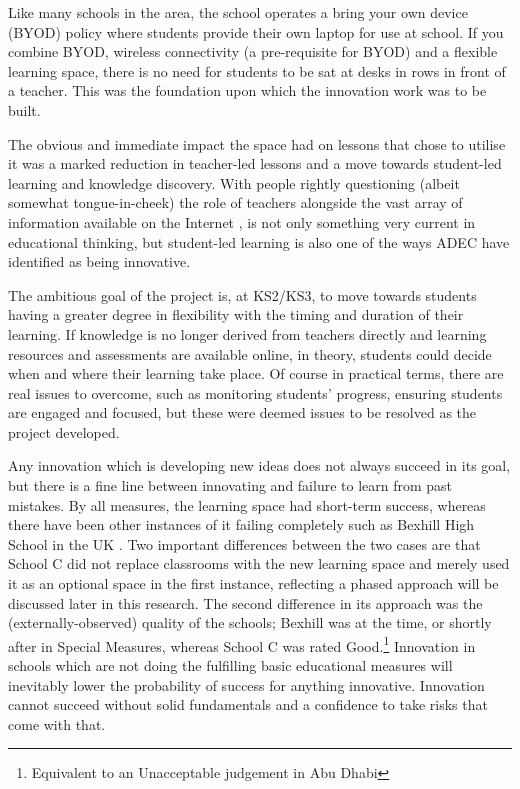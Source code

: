 \documentclass[11pt]{article}
\begin{document}
Like many schools in the area, the school operates a bring your own device (BYOD) policy where students provide their own laptop for use at school. If you combine BYOD, wireless connectivity (a pre-requisite for BYOD) and a flexible learning space, there is no need for students to be sat at desks in rows in front of a teacher. This was the foundation upon which the innovation work was to be built.

The obvious and immediate impact the space had on lessons that chose to utilise it was a marked reduction in teacher-led lessons and a move towards student-led learning and knowledge discovery. With people rightly questioning (albeit somewhat tongue-in-cheek) the role of teachers alongside the vast array of information available on the Internet \citep{gilbert2010need}, is not only something very current in educational thinking, but student-led learning is also one of the ways ADEC have identified as being innovative.

The ambitious goal of the project is, at KS2/KS3, to move towards students having a greater degree in flexibility with the timing and duration of their learning. If knowledge is no longer derived from teachers directly and learning resources and assessments are available online, in theory, students could decide when and where their learning take place. Of course in practical terms, there are real issues to overcome, such as monitoring students' progress, ensuring students are engaged and focused, but these were deemed issues to be resolved as the project developed.

Any innovation which is developing new ideas does not always succeed in its goal, but there is a fine line between innovating and failure to learn from past mistakes. By all measures, the learning space had short-term success, whereas there have been other instances of it failing completely such as Bexhill High School in the UK \citep{Lusher2015}. Two important differences between the two cases are that School C did not replace classrooms with the new learning space and merely used it as an optional space in the first instance, reflecting a phased approach will be discussed later in this research. The second difference in its approach was the (externally-observed) quality of the schools; Bexhill was at the time, or shortly after in Special Measures, whereas School C was rated Good.\footnote{Equivalent to an Unacceptable judgement in Abu Dhabi} Innovation in schools which are not doing the fulfilling basic educational measures will inevitably lower the probability of success for anything innovative. Innovation cannot succeed without solid fundamentals and a confidence to take risks that come with that.
\end{document}
